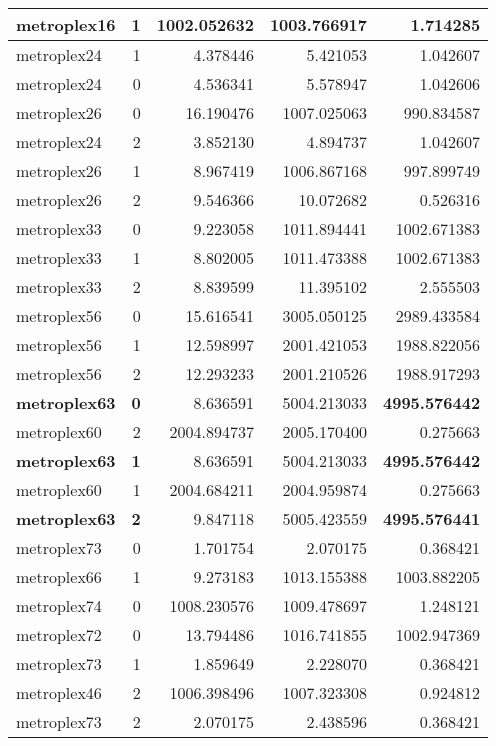 \documentclass[../../../thesis.tex]{subfiles}
\begin{document}
\begin{longtable}{|l|r|r|r|r|}
metroplex16 & 1 & 1002.052632 & 1003.766917 & 1.714285 \\\hline
metroplex24 & 1 & 4.378446 & 5.421053 & 1.042607 \\\hline
metroplex24 & 0 & 4.536341 & 5.578947 & 1.042606 \\\hline
metroplex26 & 0 & 16.190476 & 1007.025063 & 990.834587 \\\hline
metroplex24 & 2 & 3.852130 & 4.894737 & 1.042607 \\\hline
metroplex26 & 1 & 8.967419 & 1006.867168 & 997.899749 \\\hline
metroplex26 & 2 & 9.546366 & 10.072682 & 0.526316 \\\hline
metroplex33 & 0 & 9.223058 & 1011.894441 & 1002.671383 \\\hline
metroplex33 & 1 & 8.802005 & 1011.473388 & 1002.671383 \\\hline
metroplex33 & 2 & 8.839599 & 11.395102 & 2.555503 \\\hline
metroplex56 & 0 & 15.616541 & 3005.050125 & 2989.433584 \\\hline
metroplex56 & 1 & 12.598997 & 2001.421053 & 1988.822056 \\\hline
metroplex56 & 2 & 12.293233 & 2001.210526 & 1988.917293 \\\hline
\textbf{metroplex63} & \textbf{0} & 8.636591 & 5004.213033 & \textbf{4995.576442} \\\hline
metroplex60 & 2 & 2004.894737 & 2005.170400 & 0.275663 \\\hline
\textbf{metroplex63} & \textbf{1} & 8.636591 & 5004.213033 & \textbf{4995.576442} \\\hline
metroplex60 & 1 & 2004.684211 & 2004.959874 & 0.275663 \\\hline
\textbf{metroplex63} & \textbf{2} & 9.847118 & 5005.423559 & \textbf{4995.576441} \\\hline
metroplex73 & 0 & 1.701754 & 2.070175 & 0.368421 \\\hline
metroplex66 & 1 & 9.273183 & 1013.155388 & 1003.882205 \\\hline
metroplex74 & 0 & 1008.230576 & 1009.478697 & 1.248121 \\\hline
metroplex72 & 0 & 13.794486 & 1016.741855 & 1002.947369 \\\hline
metroplex73 & 1 & 1.859649 & 2.228070 & 0.368421 \\\hline
metroplex46 & 2 & 1006.398496 & 1007.323308 & 0.924812 \\\hline
metroplex73 & 2 & 2.070175 & 2.438596 & 0.368421 \\\hline

\end{longtable}
\end{document}
